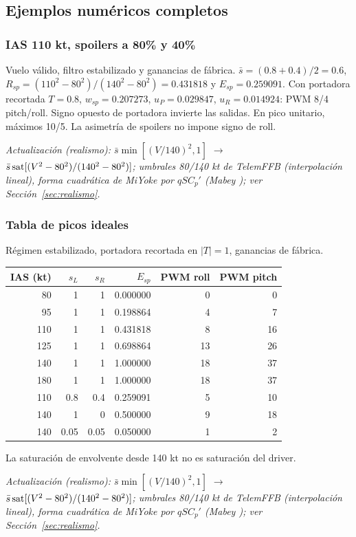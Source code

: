 \subsection{Ejemplos numéricos completos}
\subsubsection{IAS 110 kt, spoilers a 80\% y 40\%}
Vuelo válido, filtro estabilizado y ganancias de fábrica. $\bar s=(0.8+0.4)/2=0.6$, $R_{sp}=(110^2-80^2)/(140^2-80^2)=0.431818$ y $E_{sp}=0.259091$. Con portadora recortada $T=0.8$, $w_{sp}=0.207273$, $u_P=0.029847$, $u_R=0.014924$: PWM 8/4 pitch/roll. Signo opuesto de portadora invierte las salidas. En pico unitario, máximos 10/5. La asimetría de spoilers no impone signo de roll.

\textit{Actualización (realismo): $\bar s\min[(V/140)^2,1]$ $\rightarrow$ $\bar s\operatorname{sat}[(V^2-80^2)/(140^2-80^2)]$; umbrales 80/140 kt de TelemFFB (interpolación lineal), forma cuadrática de MiYoke por $qSC_p'$ (Mabey \cite{mabey1988}); ver Sección~\ref{sec:realismo}.}

\subsubsection{Tabla de picos ideales}
Régimen estabilizado, portadora recortada en $|T|=1$, ganancias de fábrica.
\begin{center}\begin{tabular}{rrrrrr}
\toprule IAS (kt)&$s_L$&$s_R$&$E_{sp}$&PWM roll&PWM pitch\\\midrule
80&1&1&0.000000&0&0\\
95&1&1&0.198864&4&7\\
110&1&1&0.431818&8&16\\
125&1&1&0.698864&13&26\\
140&1&1&1.000000&18&37\\
180&1&1&1.000000&18&37\\
110&0.8&0.4&0.259091&5&10\\
140&1&0&0.500000&9&18\\
140&0.05&0.05&0.050000&1&2\\
\bottomrule\end{tabular}\end{center}
La saturación de envolvente desde 140 kt no es saturación del driver.

\textit{Actualización (realismo): $\bar s\min[(V/140)^2,1]$ $\rightarrow$ $\bar s\operatorname{sat}[(V^2-80^2)/(140^2-80^2)]$; umbrales 80/140 kt de TelemFFB (interpolación lineal), forma cuadrática de MiYoke por $qSC_p'$ (Mabey \cite{mabey1988}); ver Sección~\ref{sec:realismo}.}

